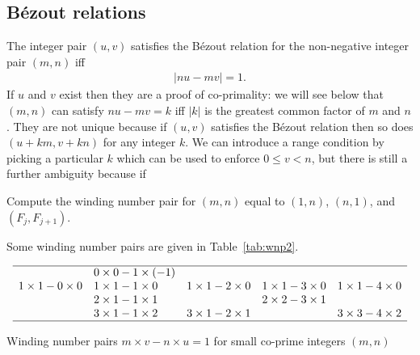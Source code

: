 \subsection{B\'ezout relations}
The integer pair $(u,v)$ satisfies the B\'ezout relation for the non-negative integer pair $(m,n)$ iff
\begin{align}
	|n  u-mv| = 1.
\end{align}
If $u$ and $v$ exist then they are a proof of co-primality: we will see below that $(m,n)$ can satisfy  $ n  u - m v= k$ iff $|k|$ is the greatest common factor of $m$ and $n$. They are not unique because if $(u,v)$ satisfies the B\'ezout relation then so does $(u+km,v+kn)$ for any integer $k$. We can introduce a range condition by picking a particular $k$ which can be used to enforce $0\leq v< n$, but there is still a further ambiguity because if



\begin{jExercise}
	Compute the winding number pair for $(m,n)$ equal to  $(1,n)$, $(n,1)$, and $(F_j,F_{j+1})$.
\end{jExercise}
\begin{jAnswer} 
	\label{ex:wnp}
	Some winding number pairs are given in Table~\ref{tab:wnp2}.
	\begin{table}
		\begin{equation*}
			\begin{array}{lllll}
				\hline
				\text{} & 0\times 0-1\times (-1) & \text{} & \text{} & \text{} \\
				1\times 1-0\times 0 & 1\times 1-1\times 0 & 1\times 1-2\times 0 & 1\times 1-3\times 0 & 1\times 1-4\times 0 \\
				\text{} & 2\times 1-1\times 1 & \text{} & 2\times 2-3\times 1 & \text{} \\
				\text{} & 3\times 1-1\times 2 & 3\times 1-2\times 1 & \text{} & 3\times 3-4\times 2 \\
				\hline
			\end{array}
		\end{equation*}
		\caption{Winding number pairs $m\times v-n\times u=1$ for small co-prime integers $(m,n)$}
		\label{tab:wnp2}
	\end{table}
	
\end{jAnswer}


